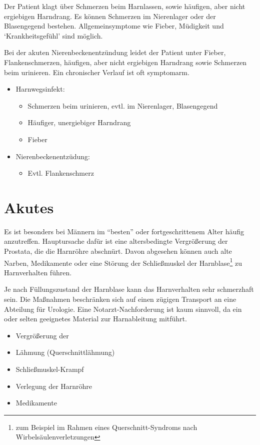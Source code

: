 \TextSlide{\TxSymptome}
{Der Patient klagt über Schmerzen beim Harnlassen, sowie
häufigen, aber nicht ergiebigen Harndrang. Es können
Schmerzen im Nierenlager oder der Blasengegend bestehen.
Allgemeinsymptome wie Fieber, Müdigkeit und
\enquote*{Krankheitsgefühl} sind möglich. 

Bei der akuten
Nierenbeckenentzündung leidet der Patient unter Fieber,
Flankenschmerzen, häufigen, aber nicht ergiebigen Harndrang
sowie Schmerzen beim urinieren. Ein chronischer Verlauf ist 
oft symptomarm.
}
{
\begin{itemize}
  \item Harnwegsinfekt:
  \begin{itemize}
    \item Schmerzen beim urinieren, evtl. im Nierenlager,
    Blasengegend
    \item Häufiger, unergiebiger Harndrang
    \item Fieber
  \end{itemize}
  \item Nierenbeckenentzüdung:
  \begin{itemize}
    \item Evtl. Flankenschmerz
  \end{itemize}
\end{itemize}
}
{}
{}
{}


\section{Akutes }
\label{topic:harnverhalten}%

{%
Es ist besonders bei Männern im
\enquote{besten} oder fortgeschrittenem Alter häufig
anzutreffen. Hauptursache  dafür ist eine altersbedingte
Vergrößerung der
Prostata, die die Harnröhre abschnürt. Davon abgesehen
können auch alte Narben, Medikamente oder eine Störung der
Schließmuskel der Harnblase\footnote{zum Beispiel im Rahmen
eines Querschnitt-Syndroms nach Wirbelsäulenverletzungen} zu
Harnverhalten führen.

Je nach Füllungszustand der Harnblase kann das
Harnverhalten sehr schmerzhaft sein.
Die Maßnahmen beschränken sich auf einen zügigen Transport
an eine Abteilung für Urologie. Eine Notarzt-Nachforderung
ist kaum sinnvoll, da ein  oder  selten geeignetes
Material zur Harnableitung mitführt. 
}
{
\begin{itemize}
  \item Vergrößerung der 
  \item Lähmung (Querschnittlähmung)
  \item Schließmuskel-Krampf
  \item Verlegung der Harnröhre
  \item Medikamente
\end{itemize}
}{}{}{}

